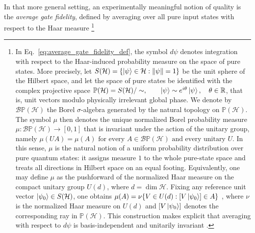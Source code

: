 In that more general setting, an experimentally meaningful notion of quality is the \emph{average gate fidelity}, defined by averaging over all pure input states with respect to the Haar measure
\footnote{In Eq.~\eqref{eq:average_gate_fidelity_def}, the symbol \(d\psi\) denotes integration with respect to the Haar-induced probability measure on the space of pure states. More precisely, let
\( 
S(\mathcal{H}) = \left\{ \ket{\psi}\in\mathcal{H}:\|\psi\|=1 \right\}
\)
be the unit sphere of the Hilbert space, and let the space of pure states be identified with the complex projective space
\( 
\mathbb{P}(\mathcal{H}) = S(\mathcal{H})/\sim, \qquad \ket{\psi}\sim e^{i\theta}\ket{\psi}, \quad \theta\in\mathbb{R}
\),
that is, unit vectors modulo physically irrelevant global phase. We denote by
\(
\mathcal{B}\mathbb{P}(\mathcal{H})
\)
the Borel \(\sigma\)-algebra generated by the natural topology on \(\mathbb{P}(\mathcal{H})\). The symbol \(\mu\) then denotes the unique normalized Borel probability measure
\( 
\mu : \mathcal{B}\mathbb{P}(\mathcal{H}) \longrightarrow [0,1] 
\) 
that is invariant under the action of the unitary group, namely
\(
\mu(UA)=\mu(A) \text{ for every }A\in\mathcal{B}\mathbb{P}(\mathcal{H}) \text{ and every unitary }U. 
\) 
In this sense, \(\mu\) is the natural notion of a uniform probability distribution over pure quantum states: it assigns measure \(1\) to the whole pure-state space and treats all directions in Hilbert space on an equal footing. \cite{Watrous2018}
Equivalently, one may define \(\mu\) as the pushforward of the normalized Haar measure on the compact unitary group \(U(d)\), where \(d=\dim\mathcal{H}\). Fixing any reference unit vector \(\ket{\psi_0}\in S(\mathcal{H})\), one obtains
\( 
\mu(A) = \nu \{ V\in U(d): [V\ket{\psi_0}] \in A \}
\)
, where \(\nu\) is the normalized Haar measure on \(U(d)\) and \([V\ket{\psi_0}]\) denotes the corresponding ray in \(\mathbb{P}(\mathcal{H})\). This construction makes explicit that averaging with respect to \(d\psi\) is basis-independent and unitarily invariant \cite{Watrous2018}.}

